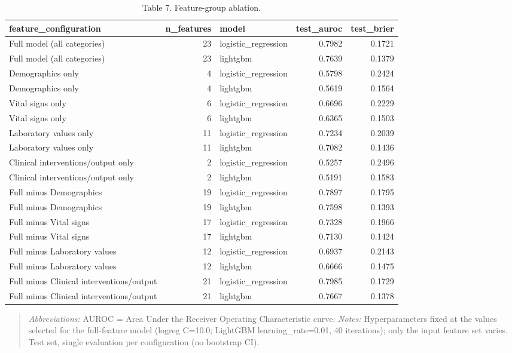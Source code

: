 \begin{table}[htbp]
\centering
\caption{Table 7. Feature-group ablation.}
\label{table7_ablation}
\begin{tabular}{lrlrr}
\toprule
feature\_configuration & n\_features & model & test\_auroc & test\_brier \\
\midrule
Full model (all categories) & 23 & logistic\_regression & 0.7982 & 0.1721 \\
Full model (all categories) & 23 & lightgbm & 0.7639 & 0.1379 \\
Demographics only & 4 & logistic\_regression & 0.5798 & 0.2424 \\
Demographics only & 4 & lightgbm & 0.5619 & 0.1564 \\
Vital signs only & 6 & logistic\_regression & 0.6696 & 0.2229 \\
Vital signs only & 6 & lightgbm & 0.6365 & 0.1503 \\
Laboratory values only & 11 & logistic\_regression & 0.7234 & 0.2039 \\
Laboratory values only & 11 & lightgbm & 0.7082 & 0.1436 \\
Clinical interventions/output only & 2 & logistic\_regression & 0.5257 & 0.2496 \\
Clinical interventions/output only & 2 & lightgbm & 0.5191 & 0.1583 \\
Full minus Demographics & 19 & logistic\_regression & 0.7897 & 0.1795 \\
Full minus Demographics & 19 & lightgbm & 0.7598 & 0.1393 \\
Full minus Vital signs & 17 & logistic\_regression & 0.7328 & 0.1966 \\
Full minus Vital signs & 17 & lightgbm & 0.7130 & 0.1424 \\
Full minus Laboratory values & 12 & logistic\_regression & 0.6937 & 0.2143 \\
Full minus Laboratory values & 12 & lightgbm & 0.6666 & 0.1475 \\
Full minus Clinical interventions/output & 21 & logistic\_regression & 0.7985 & 0.1729 \\
Full minus Clinical interventions/output & 21 & lightgbm & 0.7667 & 0.1378 \\
\bottomrule
\end{tabular}

\end{table}


\begin{quote}\small
\textit{Abbreviations:} AUROC = Area Under the Receiver Operating Characteristic curve.
\textit{Notes:} Hyperparameters fixed at the values selected for the full-feature model (logreg C=10.0; LightGBM learning_rate=0.01, 40 iterations); only the input feature set varies. Test set, single evaluation per configuration (no bootstrap CI).
\end{quote}